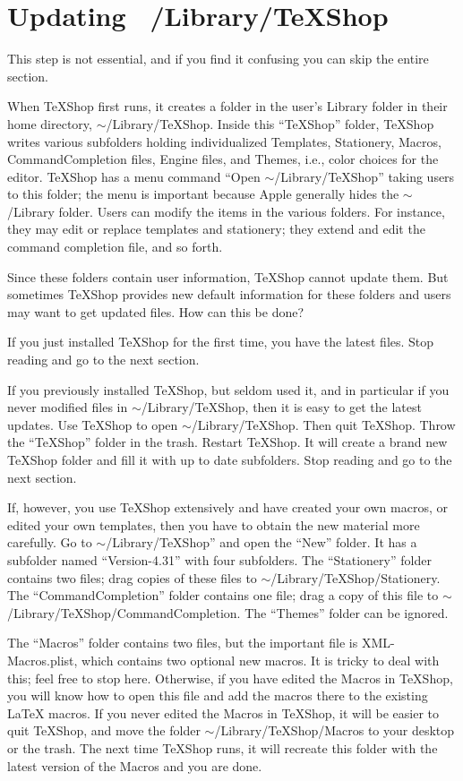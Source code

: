 \documentclass[11pt, oneside]{article}   	%
\begin{document}
 
 \section{Updating ~/Library/TeXShop}
 
 This step is not essential, and if you find it confusing you can  skip the entire section.
 
 When TeXShop first runs, it creates a folder in the user's Library folder in their home directory,  $\sim$/Library/TeXShop. Inside this ``TeXShop'' folder, TeXShop writes various subfolders  holding individualized  Templates, Stationery, Macros, CommandCompletion files, Engine files, and Themes, i.e., color choices for the editor. TeXShop has a menu command ``Open $\sim$/Library/TeXShop'' taking users to this folder; the menu is important because Apple generally hides the $\sim$/Library folder. Users can modify the items in the various folders. For instance, they may edit or replace  templates and  stationery; 
 they extend and edit the command completion file, and so forth.

Since these folders contain user information, TeXShop cannot update them. But sometimes TeXShop provides new default information for these folders and users may want to get updated files.  How can this be done?

If you just installed TeXShop for the first time, you have the latest files. Stop reading and go to the next section.

If you previously installed TeXShop, but seldom used it, and in particular if you never modified files in $\sim$/Library/TeXShop, then it is easy to get the latest updates. Use TeXShop to open $\sim$/Library/TeXShop. Then quit TeXShop.
Throw the ``TeXShop'' folder in the trash. Restart TeXShop. It will create a brand new TeXShop folder and fill it with up to date subfolders. Stop reading and go to the next section.

If, however, you use TeXShop extensively and have created your own macros, or edited your own templates, then you have to obtain the new material more carefully. Go to  $\sim$/Library/TeXShop'' and open the ``New'' folder. It has a subfolder named ``Version-4.31'' with four subfolders. The ``Stationery'' folder contains two files; drag copies of these files to $\sim$/Library/TeXShop/Stationery. The ``CommandCompletion'' folder contains one file; drag a copy of this file to $\sim$/Library/TeXShop/CommandCompletion. The ``Themes'' folder can be ignored.

The ``Macros'' folder contains two files, but the important file is XML-Macros.plist, which contains two optional new macros. It is tricky to deal with this; feel free to stop here. Otherwise, if you have edited the Macros in TeXShop, you will know how to open this file and  add the macros there to the existing LaTeX macros. If you never edited the Macros in TeXShop, it will be easier to quit TeXShop, and move the folder $\sim$/Library/TeXShop/Macros to your desktop or the trash. The next time TeXShop runs, it will recreate this folder with the latest version of the Macros and you are done. 
\end{document}
